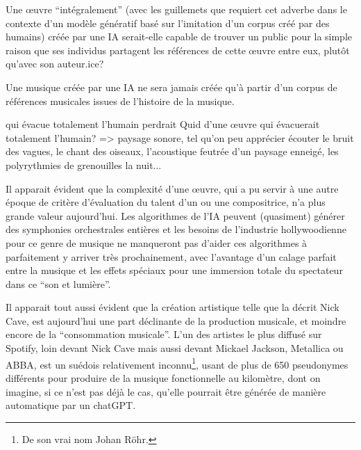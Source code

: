 

Une œuvre ``intégralement'' (avec les guillemets que requiert cet adverbe dans le contexte d'un modèle génératif basé sur l'imitation d'un corpus créé par des humains) créée par une IA serait-elle capable de trouver un public pour la simple raison que ses individus partagent les références de cette œuvre entre eux, plutôt qu'avec son auteur.ice?

Une musique créée par une IA ne sera jamais créée qu'à partir d'un corpus de références musicales issues de l'histoire de la musique.

qui évacue totalement l'humain perdrait 
Quid d'une œuvre qui évacuerait totalement l'humain?
=> paysage sonore, tel qu'on peu apprécier écouter le bruit des vagues, le chant des oiseaux, l'acoustique feutrée d'un paysage enneigé, les polyrythmies de grenouilles la nuit...


Il apparait évident que la complexité d'une œuvre, qui a pu servir à une autre époque de critère d'évaluation du talent d'un ou une compositrice, n'a plus grande valeur aujourd'hui. Les algorithmes de l'IA peuvent (quasiment) générer des symphonies orchestrales entières et les besoins de l'industrie hollywoodienne pour ce genre de musique ne manqueront pas d'aider ces algorithmes à parfaitement y arriver très prochainement, avec l'avantage d'un calage parfait entre la musique et les effets spéciaux pour une immersion totale du spectateur dans ce ``son et lumière''.

Il apparait tout aussi évident que la création artistique telle que la décrit Nick Cave, est aujourd'hui une part déclinante de la production musicale, et moindre encore de la ``consommation musicale''. L'un des artistes le plus diffusé sur Spotify, loin devant Nick Cave mais aussi devant Mickael Jackson, Metallica ou ABBA, est un suédois relativement inconnu\footnote{De son vrai nom Johan Röhr.}, usant de plus de 650 pseudonymes différents pour produire de la musique fonctionnelle au kilomètre, dont on imagine, si ce n'est pas déjà le cas, qu'elle pourrait être générée de manière automatique par un chatGPT.

